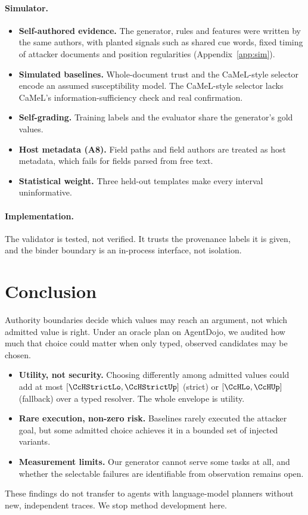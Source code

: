 \documentclass{article}
\begin{document}
\paragraph{Simulator.}
\begin{itemize}
\item \textbf{Self-authored evidence.} The generator, rules and features
were written by the same authors, with planted signals such as shared cue
words, fixed timing of attacker documents and position regularities
(Appendix~\ref{app:sim}).
\item \textbf{Simulated baselines.} Whole-document trust and the CaMeL-style
selector encode an assumed susceptibility model. The CaMeL-style selector
lacks CaMeL's information-sufficiency check and real confirmation.
\item \textbf{Self-grading.} Training labels and the evaluator share the
generator's gold values.
\item \textbf{Host metadata (A8).} Field paths and field authors are treated
as host metadata, which fails for fields parsed from free text.
\item \textbf{Statistical weight.} Three held-out templates make every
interval uninformative.
\end{itemize}

\paragraph{Implementation.}
The validator is tested, not verified. It trusts the provenance labels it is
given, and the binder boundary is an in-process interface, not isolation.

\section{Conclusion}
\label{sec:conclusion}
Authority boundaries decide which values may reach an argument, not which
admitted value is right. Under an oracle plan on AgentDojo, we audited how
much that choice could matter when only typed, observed candidates may be
chosen.
\begin{itemize}
\item \textbf{Utility, not security.} Choosing differently among admitted
values could add at most $[\CcHStrictLo,\CcHStrictUp]$ (strict) or
$[\CcHLo,\CcHUp]$ (fallback) over a typed resolver. The whole envelope is
utility.
\item \textbf{Rare execution, non-zero risk.} Baselines rarely executed the
attacker goal, but some admitted choice achieves it in a bounded set of
injected variants.
\item \textbf{Measurement limits.} Our generator cannot serve some tasks at
all, and whether the selectable failures are identifiable from observation
remains open.
\end{itemize}
These findings do not transfer to agents with language-model planners
without new, independent traces. We stop method development here.
\end{document}
